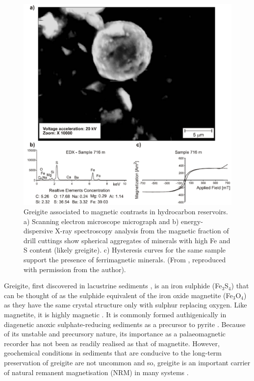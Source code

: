 \begin{figure}
\centering
\includegraphics[width=\textwidth]{intro/figs/framboid_oil.pdf}
\caption[Greigite associated to hydrocarbon related magnetic contrasts]{Greigite associated to magnetic contrasts in hydrocarbon reservoirs. a) Scanning electron microscope micrograph and b) energy-dispersive X-ray spectroscopy analysis from the magnetic fraction of drill cuttings show spherical aggregates of minerals with high Fe and S content (likely greigite). c) Hysteresis curves for the same sample support the presence of ferrimagnetic minerals. (From \citet{Guzman2011}, reproduced with permission from the author).}
\label{fram_oil}
\end{figure}
\par

Greigite, first discovered in lacustrine sediments \citep{Skinner1964}, is an iron sulphide (Fe$_3$S$_4$) that can be thought of as the sulphide equivalent of the iron oxide magnetite (Fe$_3$O$_4$) as they have the same crystal structure only with sulphur replacing oxygen. Like magnetite, it is highly magnetic \citep{Li2014}. It is commonly formed authigenically in diagenetic anoxic sulphate-reducing sediments \citep{Roberts2011} as a precursor to pyrite \citep{Berner1984,Hunger2007}. Because of its unstable and precursory nature, its importance as a palaeomagnetic recorder has not been as readily realised as that of magnetite. However, geochemical conditions in sediments that are conducive to the long-term preservation of greigite are not uncommon \citep{Roberts2011,Roberts2015} and so, greigite is an important carrier of natural remanent magnetisation (NRM) in many systems \citep{Reynolds1994,Snowball1997,Ron2007,Roberts2010}.\par

